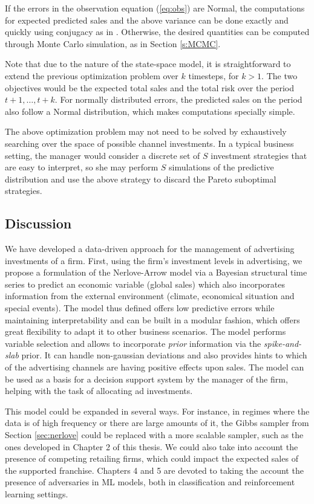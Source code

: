 If the errors in the observation equation (\ref{eq:obs}) are Normal, the computations for expected predicted sales and the above variance can be done exactly and quickly using conjugacy as in \parencite[3.7.1]{zbMATH06123712}.
Otherwise, the desired quantities can be computed through Monte Carlo simulation, as in Section \ref{s:MCMC}.

Note that due to the nature of the state-space model, it is straightforward to extend the previous optimization problem over $k$ timesteps, for $k>1$.
The two objectives would be the expected total sales and the total risk over the period $t+1,\dots,t+k$.
For normally distributed errors, the predicted sales on the period also follow a Normal distribution, which makes computations specially simple.

The above optimization problem may not need to be solved by exhaustively searching over the space of possible channel investments. In a typical business setting, the manager would consider a discrete set of $S$ investment strategies that are easy to interpret, so she may perform $S$ simulations of the predictive distribution and use the above strategy to discard the Pareto suboptimal strategies.

\subsection{Discussion}

We have developed a data-driven approach for the management of advertising investments of a firm. First, using the firm's investment levels in advertising, we propose a formulation of the Nerlove-Arrow model via a Bayesian structural time series to predict an economic variable (global sales)  which also incorporates information from the external environment (climate, economical situation and special events). The model thus defined offers low predictive errors while maintaining interpretability and can be built in a modular fashion, which offers great flexibility to adapt it to other business scenarios. The model performs variable selection and allows to incorporate \emph{prior} information via the \emph{spike-and-slab} prior. It can handle non-gaussian deviations and also provides hints to which of the advertising channels are having positive effects upon sales. The model can be used as a basis for a decision support system by the manager of the firm, helping with the task of allocating ad investments.

This model could be expanded in several ways. For instance, in regimes where the data is of high frequency or there are large amounts of it, the Gibbs sampler from Section \ref{sec:nerlove} could be replaced with a more scalable sampler, such as the ones developed in Chapter 2 of this thesis. We could also take into account the presence of competing retailing firms, which could impact the expected sales of the supported franchise. Chapters 4 and 5 are devoted to taking the account the presence of adversaries in ML models, both in classification and reinforcement learning settings.

